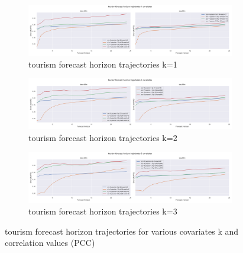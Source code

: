\documentclass{article}
\begin{document}
\begin{figure}[tbp]

\begin{subfigure}{\textwidth}
\centering
\includegraphics[width=\linewidth]{figures/models_tour_k1.png}
\caption{tourism forecast horizon trajectories k=1}
\label{fig:base-lstm_seg-lstm_tourism_k_1_trajectory}
\end{subfigure}

\begin{subfigure}{\textwidth}
\centering
\includegraphics[width=\linewidth]{figures/models_tour_k2.png}
\caption{tourism forecast horizon trajectories k=2}
\label{fig:base-lstm_seg-lstm_tourism_k_2_trajectory}
\end{subfigure}

\begin{subfigure}{\textwidth}
\centering
\includegraphics[width=\linewidth]{figures/models_tour_k3.png}
\caption{tourism forecast horizon trajectories k=3}
\label{fig:base-lstm_seg-lstm_tourism_k_3_trajectory}
\end{subfigure}
\caption{tourism forecast horizon trajectories for various covariates k and correlation values (PCC)}
\label{fig:base-lstm_seg-lstm_tourism_trajectory}
\end{figure}
\end{document}
